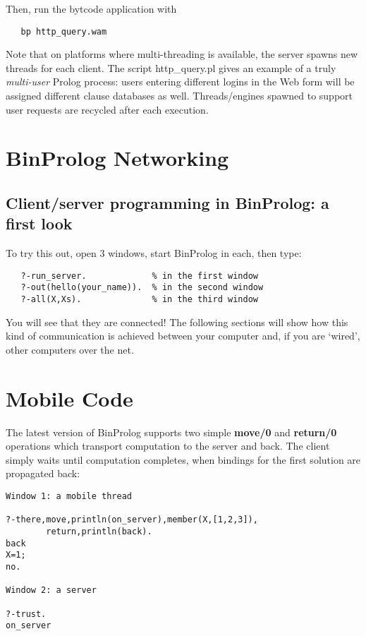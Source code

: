 \documentclass{article}
\begin{document}
Then, run the bytcode application with

\begin{verbatim}
   bp http_query.wam
\end{verbatim}

Note that on platforms where multi-threading is available,
the server spawns new threads for each client.
The script http\_query.pl gives an example of a truly
{\em multi-user} Prolog process: users entering different logins
in the Web form will be assigned different clause databases as well.
Threads/engines spawned to support user requests are recycled after
each execution.


\section{BinProlog Networking}

\subsection{Client/server programming in BinProlog: a first look}

To try this out, open 3 windows, start BinProlog in each, then type:

\begin{verbatim}
   ?-run_server.             % in the first window
   ?-out(hello(your_name)).  % in the second window
   ?-all(X,Xs).              % in the third window
\end{verbatim}

You will see that they are connected! The following sections
will show how this kind of communication is achieved between
your computer and, if you are `wired', other computers over the net.


\section{Mobile Code}

The latest version of BinProlog supports two simple {\bf move/0} and {\bf return/0}
operations which transport
computation to the server and back. 
The client simply waits until computation completes, when bindings
 for the first solution are propagated back:

{\small \begin{verbatim}
Window 1: a mobile thread 

?-there,move,println(on_server),member(X,[1,2,3]),
        return,println(back). 
back
X=1; 
no. 

Window 2: a server 

?-trust. 
on_server 
\end{verbatim}}
\end{document}
